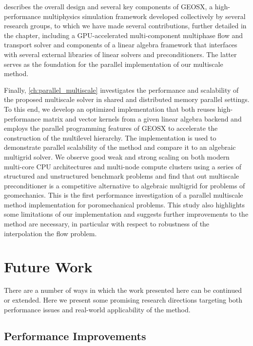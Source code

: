  describes the overall design and several key components of GEOSX, a high-performance multiphysics simulation framework developed collectively by several research groups, to which we have made several contributions, further detailed in the chapter, including a GPU-accelerated multi-component multiphase flow and transport solver and components of a linear algebra framework that interfaces with several external libraries of linear solvers and preconditioners.   The latter serves as the foundation for the parallel implementation of our multiscale method.

Finally, \cref{ch:parallel_multiscale} investigates the performance and scalability of the proposed multiscale solver in shared and distributed memory parallel settings.   To this end, we develop an optimized implementation that both reuses high-performance matrix and vector kernels from a given linear algebra backend and employs the parallel programming features of GEOSX to accelerate the construction of the multilevel hierarchy.   The implementation is used to demonstrate parallel scalability of the method and compare it to an algebraic multigrid solver.   We observe good weak and strong scaling on both modern multi-core CPU architectures and multi-node compute clusters using a series of structured and unstructured benchmark problems and find that out multiscale preconditioner is a competitive alternative to algebraic multigrid for problems of geomechanics.   This is the first performance investigation of a parallel multiscale method implementation for poromechanical problems.   This study also highlights some limitations of our implementation and suggests further improvements to the method are necessary, in particular with respect to robustness of the interpolation the flow problem.

\section{Future Work}

There are a number of ways in which the work presented here can be continued or extended.   Here we present some promising research directions targeting both performance issues and real-world applicability of the method.

\subsection{Performance Improvements}

